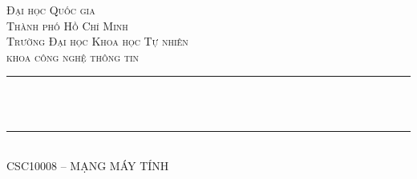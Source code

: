 \thispagestyle{empty}
\begin{titlepage}
	\begin{center}
		\makeatletter
		\newcommand{\HRule}{\rule{\linewidth}{0.4mm}}

		\textsc{\LARGE Đại học Quốc gia\\Thành phố Hồ Chí Minh}\\[1.5cm]
		\textsc{\Large Trường Đại học Khoa học Tự nhiên}\\[0.5cm]
		\textsc{\Large khoa công nghệ thông tin}\\[1.5cm]

		{\HRule}\\[1cm]
		{\huge \bfseries \@title}\\[0.5cm]
		{\HRule}\\[2cm]

		\textsc{\large CSC10008 -- MẠNG MÁY TÍNH}\\[0.5cm]

		\vfill\vfill\vfill

		{\large \@author}\\[1.5cm]
		{\large \@date}
		\makeatother
	\end{center}
\end{titlepage}